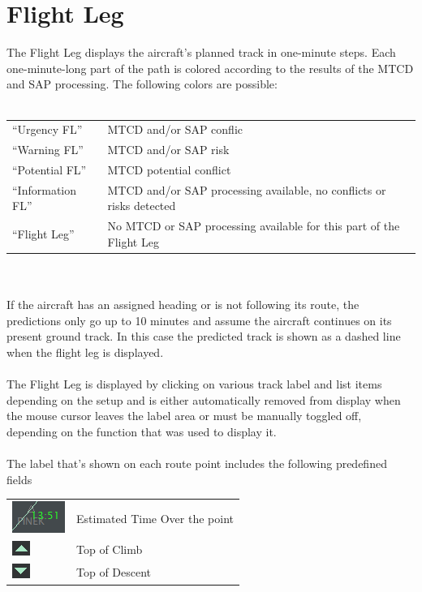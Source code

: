 \documentclass[11pt,a4paper,oldfontcommands]{memoir}
\begin{document}
\section{Flight Leg}
The Flight Leg displays the aircraft’s planned track in one-minute steps. Each one-minute-long part of the
path is colored according to the results of the MTCD and SAP processing. The following colors are possible:\\\\
\begin{tabular}{p{5cm}p{5cm}}
“Urgency FL”        & MTCD and/or SAP conflic
\\“Warning FL”      & MTCD and/or SAP risk
\\“Potential FL”    & MTCD potential conflict
\\“Information FL”  & MTCD and/or SAP processing available, no conflicts or risks detected
\\“Flight Leg”      & No MTCD or SAP processing available for this part of the Flight Leg
\end{tabular}\\\\
If the aircraft has an assigned heading or is not following its route, the predictions only go up to 10 minutes
and assume the aircraft continues on its present ground track. In this case the predicted track is shown as a
dashed line when the flight leg is displayed.\\\\
The Flight Leg is displayed by clicking on various track label and list items depending on the setup and is
either automatically removed from display when the mouse cursor leaves the label area or must be
manually toggled off, depending on the function that was used to display it.\\\\
The label that’s shown on each route point includes the following predefined fields
\begin{tabular}{p{5cm}p{5cm}}
\includegraphics{img/fleto.png}     & Estimated Time Over the point
\\\includegraphics{img/fltoc.png}   & Top of Climb
\\\includegraphics{img/fltod.png}   & Top of Descent
\end{tabular}\\   
\end{document}
